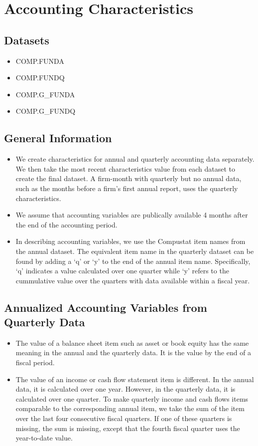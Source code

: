 \documentclass[12pt,title,fleqn]{article}
\begin{document}
\section{Accounting Characteristics}
\subsection{Datasets}
\begin{itemize}
	\item COMP.FUNDA
	\item COMP.FUNDQ
	\item COMP.G\_FUNDA
	\item COMP.G\_FUNDQ
\end{itemize}



\subsection{General Information}
\begin{itemize}
	\item  We create characteristics for annual and quarterly accounting data separately. We then take the most recent characteristics value from each dataset to create the final dataset. A firm-month with quarterly but no annual data, such as the months before a firm's first annual report, uses the quarterly characteristics.
	
	\item We assume that accounting variables are publically available 4 months after the end of the accounting period.  
	
	\item In describing accounting variables, we use the Compustat item names from the annual dataset. The equivalent item name in the quarterly dataset can be found by adding a ‘q’ or ‘y’ to the end of the annual item name. Specifically, ‘q’ indicates a value calculated over one quarter while ‘y’ refers to the cummulative value over the quarters with data available within a fiscal year.  
\end{itemize}

\subsection{Annualized Accounting Variables from Quarterly Data}
\begin{itemize}
	\item The value of a balance sheet item such as asset or book equity has the same meaning in the annual and the quarterly data. It is the value by the end of a fiscal period. 
	
	\item The value of an income or cash flow statement item is different. In the annual data, it is calculated over one year. However, in the quarterly data, it is calculated over one quarter. To make quarterly income and cash flows items comparable to the corresponding annual item, we take the sum of the item over the last four consecutive fiscal quarters. If one of these quarters is missing, the sum is missing, except that the fourth fiscal quarter uses the year-to-date value. 
\end{itemize}
\end{document}
